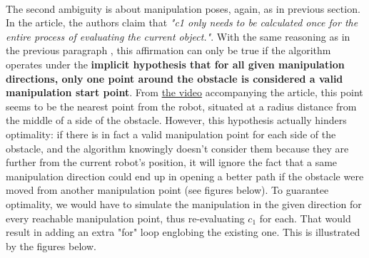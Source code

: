 \paragraph{} The second ambiguity is about manipulation poses, again, as in previous section. In the article, the authors claim that \textit{"c1 only needs to be calculated once for the entire process of evaluating the current object."}. With the same reasoning as in the previous paragraph , this affirmation can only be true if the algorithm operates under the \textbf{implicit hypothesis that for all given manipulation directions, only one point around the obstacle is considered a valid manipulation start point}. From \href{https://youtu.be/3AvfPVzBb-s}{the video} accompanying the article, this point seems to be the nearest point from the robot, situated at a radius distance from the middle of a side of the obstacle. However, this hypothesis actually hinders optimality: if there is in fact a valid manipulation point for each side of the obstacle, and the algorithm knowingly doesn't consider them because they are further from the current robot's position, it will ignore the fact that a same manipulation direction could end up in opening a better path if the obstacle were moved from another manipulation point (see figures below). To guarantee optimality, we would have to simulate the manipulation in the given direction for every reachable manipulation point, thus re-evaluating $c_{1}$ for each. That would result in adding an extra "for" loop englobing the existing one. This is illustrated by the figures below.

